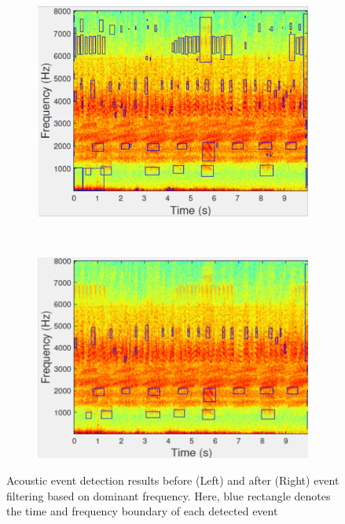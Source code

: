 \begin{figure}[htb!]
\centering

        \begin{subfigure}[b]{0.45\textwidth}
                \includegraphics[width=\textwidth, height =0.8 \textwidth]{image/Ch6/AEoriginal.png}
        \end{subfigure}
       ~
              \begin{subfigure}[b]{0.45\textwidth}
                \includegraphics[width=\textwidth,height = 0.8 \textwidth]{image/Ch6/AEfinal.png}                
        \end{subfigure}     
\caption[Acoustic event detection results]{Acoustic event detection results before (Left) and after (Right) event filtering based on dominant frequency. Here, blue rectangle denotes the time and frequency boundary of each detected event}
        \label{fig:feature}
\end{figure}

